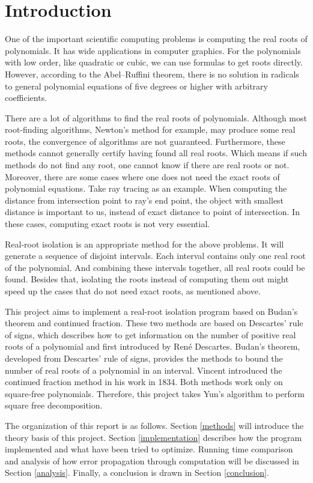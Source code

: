\section{Introduction}

One of the important scientific computing problems is computing the real roots
of polynomials. It has wide applications in computer graphics. For the
polynomials with low order, like quadratic or cubic, we can use formulas to get
roots directly. However, according to the Abel–Ruffini theorem, there is no
solution in radicals to general polynomial equations of five degrees or higher
with arbitrary coefficients\cite{Abel-Ruffini}.

There are a lot of algorithms to find the real roots of polynomials. Although
most root-finding algorithms, Newton’s method for example, may produce some real
roots, the convergence of algorithms are not guaranteed. Furthermore, these
methods cannot generally certify having found all real roots. Which means if
such methods do not find any root, one cannot know if there are real roots or
not. Moreover, there are some cases where one does not need the exact roots of
polynomial equations. Take ray tracing as an example. When computing the
distance from intersection point to ray’s end point, the object with smallest
distance is important to us, instead of exact distance to point of intersection.
In these cases, computing exact roots is not very essential.

Real-root isolation is an appropriate method for the above problems. It will
generate a sequence of disjoint intervals. Each interval contains only one real
root of the polynomial. And combining these intervals together, all real roots
could be found. Besides that, isolating the roots instead of computing them out
might speed up the cases that do not need exact roots, as mentioned above. 

This project aims to implement a real-root isolation program based on Budan’s
theorem and continued fraction. These two methods are based on Descartes’ rule
of signs, which describes how to get information on the number of positive real
roots of a polynomial and first introduced by René Descartes\cite{rule_of_sign}. Budan’s theorem,
developed from Descartes’ rule of signs, provides the methods to bound the
number of real roots of a polynomial in an interval\cite{Budan}. Vincent introduced the
continued fraction method in his work in 1834\cite{Vincent}. Both methods work only on
square-free polynomials. Therefore, this project takes Yun’s algorithm to
perform square free decomposition\cite{Yuns}.

The organization of this report is as follows. Section \ref{methods} will introduce the
theory basis of this project. Section \ref{implementation} describes how the program implemented
and what have been tried to optimize. Running time comparison and analysis of
how error propagation through computation will be discussed in Section
\ref{analysis}. Finally, a conclusion is drawn in Section \ref{conclusion}.
